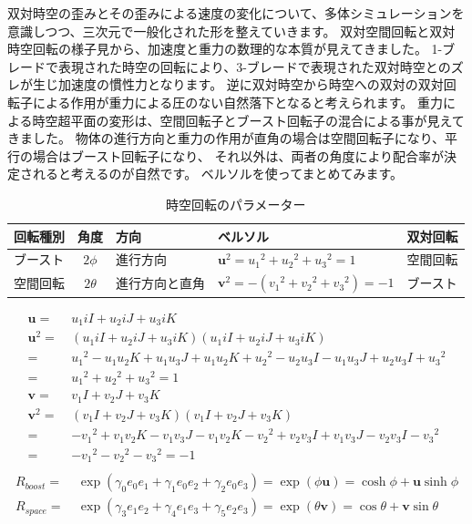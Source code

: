 \documentclass[a4paper,12pt,notitlepage]{jsreport}
\begin{document}
双対時空の歪みとその歪みによる速度の変化について、多体シミュレーションを意識しつつ、三次元で一般化された形を整えていきます。
双対空間回転と双対時空回転の様子見から、加速度と重力の数理的な本質が見えてきました。
1-ブレードで表現された時空の回転により、3-ブレードで表現された双対時空とのズレが生じ加速度の慣性力となります。
逆に双対時空から時空への双対の双対回転子による作用が重力による圧のない自然落下となると考えられます。
重力による時空超平面の変形は、空間回転子とブースト回転子の混合による事が見えてきました。
物体の進行方向と重力の作用が直角の場合は空間回転子になり、平行の場合はブースト回転子になり、
それ以外は、両者の角度により配合率が決定されると考えるのが自然です。
ベルソルを使ってまとめてみます。
\begin{table}[ht]
  \centering
  \caption{時空回転のパラメーター}
  \begin{tabular}{|l|c|l|l|l|} \hline
    回転種別 & 角度 & 方向 & ベルソル & 双対回転 \\ \hline
    ブースト & $ 2 \phi $ & 進行方向 & $ \bm{u}^2 = {u_1}^2 + {u_2}^2 + {u_3}^2 = 1 $ & 空間回転 \\ \hline
    空間回転 & $ 2 \theta $ & 進行方向と直角 & $ \bm{v}^2 = -({v_1}^2 + {v_2}^2 + {v_3}^2) = -1 $ & ブースト \\ \hline
  \end{tabular}
\end{table}
\begin{equation}
  \begin{split}
    \bm{u} = ~ & u_1 iI + u_2 iJ + u_3 iK \\
    \bm{u}^2 = ~ & (u_1 iI + u_2 iJ + u_3 iK)(u_1 iI + u_2 iJ + u_3 iK) \\
    = ~ & {u_1}^2 - u_1 u_2 K + u_1 u_3 J
    + u_1 u_2 K + {u_2}^2 - u_2 u_3 I
    - u_1 u_3 J + u_2 u_3 I + {u_3}^2 \\
    = ~ & {u_1}^2 + {u_2}^2 + {u_3}^2 = 1 \\
    \bm{v} = ~ & v_1 I + v_2 J + v_3 K \\
    \bm{v}^2 = ~ & (v_1 I + v_2 J + v_3 K)(v_1 I + v_2 J + v_3 K) \\
    = ~ & - {v_1}^2 + v_1 v_2 K - v_1 v_3 J
    - v_1 v_2 K - {v_2}^2 + v_2 v_3 I
    + v_1 v_3 J - v_2 v_3 I - {v_3}^2 \\
    = ~ & - {v_1}^2 - {v_2}^2 - {v_3}^2 = -1 \\
  \end{split}
\end{equation}
\begin{equation}
  \begin{split}
    R_{boost} = ~ & \exp(\gamma_0 e_0e_1 + \gamma_1 e_0e_2 + \gamma_2 e_0e_3)
    = \exp ( \phi \bm{u} )
    = \cosh \phi + \bm{u} \sinh \phi \\
    R_{space} = ~ & \exp(\gamma_3 e_1e_2 + \gamma_4 e_1e_3 + \gamma_5 e_2e_3)
    = \exp ( \theta \bm{v} )
    = \cos \theta + \bm{v} \sin \theta \\
  \end{split}
\end{equation}
\end{document}
